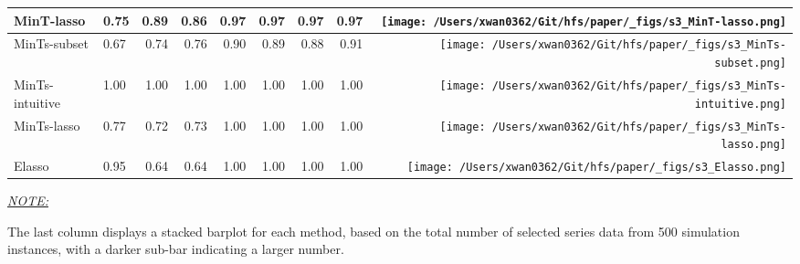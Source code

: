 \documentclass[11pt,a4paper,]{article}
\begin{document}
\begin{table}[!h]
{\begin{threeparttable}
\begin{tabular}{llrrrrrr>{}r}
MinT-lasso & 0.75 & 0.89 & 0.86 & 0.97 & 0.97 & 0.97 & 0.97 & \texttt{[image: /Users/xwan0362/Git/hfs/paper/\_figs/s3\_MinT-lasso.png]}\\
\midrule
MinTs-subset & 0.67 & 0.74 & 0.76 & 0.90 & 0.89 & 0.88 & 0.91 & \texttt{[image: /Users/xwan0362/Git/hfs/paper/\_figs/s3\_MinTs-subset.png]}\\
MinTs-intuitive & 1.00 & 1.00 & 1.00 & 1.00 & 1.00 & 1.00 & 1.00 & \texttt{[image: /Users/xwan0362/Git/hfs/paper/\_figs/s3\_MinTs-intuitive.png]}\\
MinTs-lasso & 0.77 & 0.72 & 0.73 & 1.00 & 1.00 & 1.00 & 1.00 & \texttt{[image: /Users/xwan0362/Git/hfs/paper/\_figs/s3\_MinTs-lasso.png]}\\
\midrule
Elasso & 0.95 & 0.64 & 0.64 & 1.00 & 1.00 & 1.00 & 1.00 & \texttt{[image: /Users/xwan0362/Git/hfs/paper/\_figs/s3\_Elasso.png]}\\
\bottomrule
\end{tabular}
\begin{tablenotes}[para]
\item \underline{\textit{NOTE:}} 
\item The last column displays a stacked barplot for each method, based on the total number of selected series data from 500 simulation instances, with a darker sub-bar indicating a larger number.
\end{tablenotes}
\end{threeparttable}}
\endgroup{}
\end{table}
\end{document}
